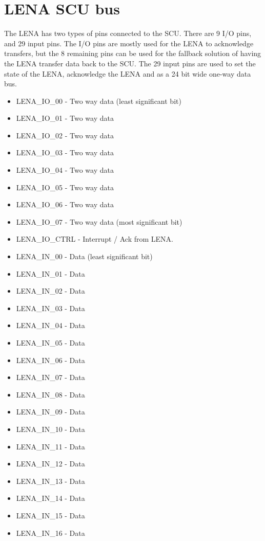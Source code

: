 \section{LENA SCU bus}
The LENA has two types of pins connected to the SCU. There are 9 I/O pins, and 29 input pins. The I/O pins are mostly used for the LENA to acknowledge transfers, but the 8 remaining pins can be used for the fallback solution of having the LENA transfer data back to the SCU. The 29 input pins are used to set the state of the LENA, acknowledge the LENA and as a 24 bit wide one-way data bus.

\begin{itemize}
\item LENA\_IO\_00 - Two way data (least significant bit)
\item LENA\_IO\_01 - Two way data
\item LENA\_IO\_02 - Two way data
\item LENA\_IO\_03 - Two way data
\item LENA\_IO\_04 - Two way data
\item LENA\_IO\_05 - Two way data
\item LENA\_IO\_06 - Two way data
\item LENA\_IO\_07 - Two way data (most significant bit)
\item LENA\_IO\_CTRL - Interrupt / Ack from LENA.
\item LENA\_IN\_00 - Data (least significant bit)
\item LENA\_IN\_01 - Data
\item LENA\_IN\_02 - Data
\item LENA\_IN\_03 - Data
\item LENA\_IN\_04 - Data
\item LENA\_IN\_05 - Data
\item LENA\_IN\_06 - Data
\item LENA\_IN\_07 - Data
\item LENA\_IN\_08 - Data
\item LENA\_IN\_09 - Data
\item LENA\_IN\_10 - Data
\item LENA\_IN\_11 - Data
\item LENA\_IN\_12 - Data
\item LENA\_IN\_13 - Data
\item LENA\_IN\_14 - Data
\item LENA\_IN\_15 - Data
\item LENA\_IN\_16 - Data

\end{itemize}

